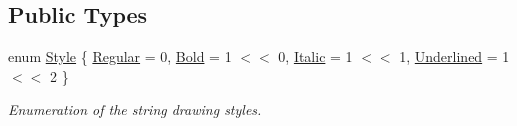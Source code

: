 \subsection*{Public Types}
\begin{DoxyCompactItemize}
\item 
enum \hyperlink{classsf_1_1_text_aa8add4aef484c6e6b20faff07452bd82}{Style} \{ \hyperlink{classsf_1_1_text_aa8add4aef484c6e6b20faff07452bd82a2af9ae5e1cda126570f744448e0caa32}{Regular} = 0, 
\hyperlink{classsf_1_1_text_aa8add4aef484c6e6b20faff07452bd82af1b47f98fb1e10509ba930a596987171}{Bold} = 1 $<$$<$ 0, 
\hyperlink{classsf_1_1_text_aa8add4aef484c6e6b20faff07452bd82aee249eb803848723c542c2062ebe69d8}{Italic} = 1 $<$$<$ 1, 
\hyperlink{classsf_1_1_text_aa8add4aef484c6e6b20faff07452bd82a664bd143f92b6e8c709d7f788e8b20df}{Underlined} = 1 $<$$<$ 2
 \}
\begin{DoxyCompactList}\small\item\em Enumeration of the string drawing styles. \end{DoxyCompactList}\end{DoxyCompactItemize}
